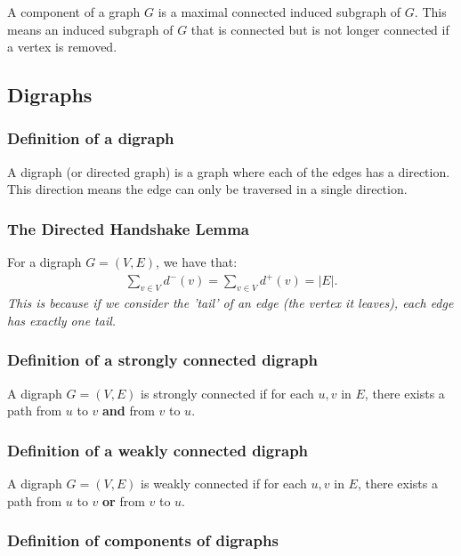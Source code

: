 \documentclass[a4paper, 12pt, twoside]{article}
\begin{document}
A component of a graph $G$ is a maximal connected 
induced subgraph of $G$. This means an induced subgraph of $G$
that is connected but is not longer connected if a vertex is
removed.

\subsection{Digraphs}

\subsubsection{Definition of a digraph}

A digraph (or directed graph) is a graph where each of the edges
has a direction. This direction means the edge can only be traversed
in a single direction.

\subsubsection{The Directed Handshake Lemma}

For a digraph $G = (V, E)$, we have that: \begin{gather*}
  \sum_{v \in V} d^-(v) = \sum_{v \in V} d^+(v) = |E|.
\end{gather*} \textit{This is because if we consider the 'tail' of an
edge (the vertex it leaves), each edge has exactly one tail.}

\subsubsection{Definition of a strongly connected digraph}

A digraph $G = (V, E)$ is strongly connected if for each $u, v$
in $E$, there exists a path from $u$ to $v$ \textbf{and} 
from $v$ to $u$.

\subsubsection{Definition of a weakly connected digraph}

A digraph $G = (V, E)$ is weakly connected if for each $u, v$
in $E$, there exists a path from $u$ to $v$ \textbf{or} 
from $v$ to $u$.

\subsubsection{Definition of components of digraphs}
\end{document}
